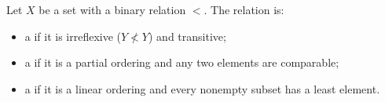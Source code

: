Let $X$ be a set with a binary relation $<$. The relation is:
\begin{itemize}
\item a  if it is irreflexive ($Y \not< Y$) and transitive;
\item a  if it is a partial ordering and any two elements are comparable;
\item a  if it is a linear ordering and every nonempty subset has a least element.
\end{itemize}
